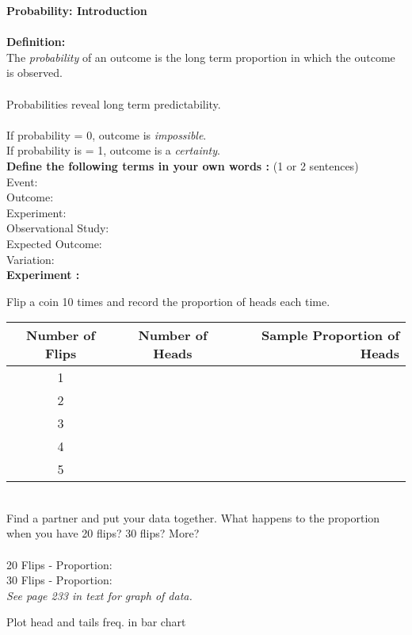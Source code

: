 \documentclass[12pt]{article}
\begin{document}
 \textbf{Probability: Introduction} \\
\\

\textbf{Definition:}
\\
 The \textit{probability} of an outcome is the long term proportion in which the outcome is observed. \\
\\
Probabilities reveal long term predictability. \\
\\
If probability = 0, outcome is \textit{impossible}. \\
If probability is = 1, outcome is a \textit{certainty}. \\ 

\textbf{Define the following terms in your own words :} (1 or 2 sentences) \\
Event:\\  [12pt]
Outcome: \\ [12pt]
Experiment:\\ [12pt]
Observational Study: \\ [12pt]
Expected Outcome:\\ [12pt]
Variation:\\

 \textbf{Experiment :}

 Flip a coin 10 times and record the proportion of heads each time.\\

\begin{tabular}{| c | c | r |}
 \hline 
Number of Flips & Number of Heads & Sample Proportion of Heads \\  \hline 
1 &  & \\  [12pt] \hline 
2 & & \\  [12pt]  \hline 
3 & & \\ \hline 
4 & & \\  \hline 
5 & & \\  \hline 
\end{tabular}
\\
Find a partner and put your data together. What happens to the proportion when you have 20 flips? 30 flips? More?\\
\\
20 Flips - Proportion: \\
30 Flips - Proportion: \\
\noindent \textit{ See page 233 in text for graph of data.}

Plot head and tails freq. in bar chart 
\end{document}
